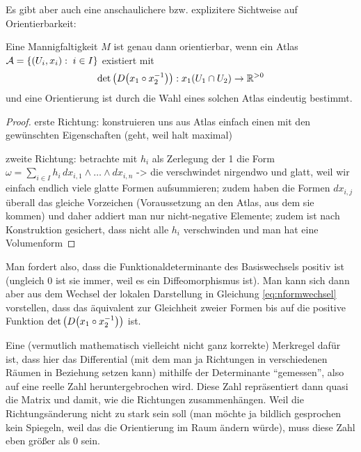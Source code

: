 \documentclass[../H_Analysis_main.tex]{subfiles}
\begin{document}
Es gibt aber auch eine anschaulichere bzw. explizitere Sichtweise auf Orientierbarkeit:
\begin{satz}[Orientierbarkeit V2]
Eine Mannigfaltigkeit $M$ ist genau dann orientierbar, wenn ein Atlas $\mathcal{A} = \qty{(U_i, x_i): \; i \in I}$ existiert mit
\begin{equation}
\det\qty(D \qty(x_1 \circ x_2^{-1})): x_1(U_1 \cap U_2) \rightarrow \mathbb{R}^{> 0}
\end{equation}
und eine Orientierung ist durch die Wahl eines solchen Atlas eindeutig bestimmt.
\end{satz}
\begin{proof}
erste Richtung: konstruieren uns aus Atlas einfach einen mit den gewünschten Eigenschaften (geht, weil halt maximal)

zweite Richtung: betrachte mit $h_i$ als Zerlegung der 1 die Form $\omega = \sum_{i \in I} h_i \, dx_{i, 1} \wedge \dots \wedge dx_{i, n}$ -> die verschwindet nirgendwo und glatt, weil wir einfach endlich viele glatte Formen aufsummieren; zudem haben die Formen $dx_{i, j}$ überall das gleiche Vorzeichen (Voraussetzung an den Atlas, aus dem sie kommen) und daher addiert man nur nicht-negative Elemente; zudem ist nach Konstruktion gesichert, dass nicht alle $h_i$ verschwinden und man hat eine Volumenform
\end{proof}

Man fordert also, dass die Funktionaldeterminante des Basiswechsels positiv ist (ungleich 0 ist sie immer, weil es ein Diffeomorphismus ist). Man kann sich dann aber aus dem Wechsel der lokalen Darstellung in Gleichung \eqref{eq:nformwechsel} vorstellen, dass das äquivalent zur Gleichheit zweier Formen bis auf die positive Funktion $\det\qty(D \qty(x_1 \circ x_2^{-1}))$ ist.

Eine (vermutlich mathematisch vielleicht nicht ganz korrekte) Merkregel dafür ist, dass hier das Differential (mit dem man ja Richtungen in verschiedenen Räumen in Beziehung setzen kann) mithilfe der Determinante \enquote{gemessen}, also auf eine reelle Zahl heruntergebrochen wird. Diese Zahl repräsentiert dann quasi die Matrix und damit, wie die Richtungen zusammenhängen. Weil die Richtungsänderung nicht zu stark sein soll (man möchte ja bildlich gesprochen kein Spiegeln, weil das die Orientierung im Raum ändern würde), muss diese Zahl eben größer als 0 sein.
\end{document}

